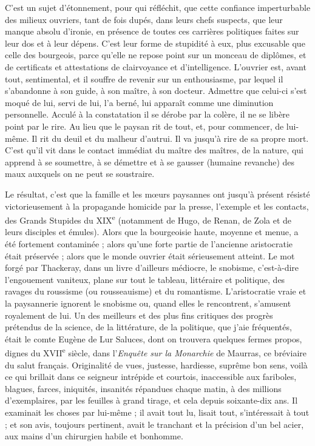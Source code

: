 \documentclass[french,twoside]{book} %
\begin{document}
C’est un sujet d’étonnement, pour qui réfléchit, que cette confiance imperturbable des milieux ouvriers, tant de fois dupés, dans leurs chefs suspects, que leur manque absolu d’ironie, en présence de toutes ces carrières politiques faites sur leur dos et à leur dépens. C’est leur forme de stupidité à eux, plus excusable que celle des bourgeois, parce qu’elle ne repose point sur un monceau de diplômes, et de certificats et attestations de clairvoyance et d’intelligence. L’ouvrier est, avant tout, sentimental, et il souffre de revenir sur un enthousiasme, par lequel il s’abandonne à son guide, à son maître, à son docteur. Admettre que celui-ci s’est moqué de lui, servi de lui, l’a berné, lui apparaît comme une diminution personnelle. Acculé à la constatation il se dérobe par la colère, il ne se libère point par le rire. Au lieu que le paysan rit de tout, et, pour commencer, de lui-même. Il rit du deuil et du malheur d’autrui. Il va jusqu’à rire de sa propre mort. C’est qu’il vit dans le contact immédiat du maître des maîtres, de la nature, qui apprend à se soumettre, à se démettre et à se gausser (humaine revanche) des maux auxquels on ne peut se soustraire.\par
Le résultat, c’est que la famille et les mœurs paysannes ont jusqu’à présent résisté victorieusement à la propagande homicide par la presse, l’exemple et les contacts, des Grands Stupides du XIX\textsuperscript{e} (notamment de Hugo, de Renan, de Zola et de leurs disciples et émules). Alors que la bourgeoisie haute, moyenne et menue, a été fortement contaminée ; alors qu’une forte partie de l’ancienne aristocratie était préservée ; alors que le monde ouvrier était sérieusement atteint. Le mot forgé par Thackeray, dans un livre d’ailleurs médiocre, le snobisme, c’est-à-dire l’engouement vaniteux, plane sur tout le tableau, littéraire et politique, des ravages du roussisme (ou rousseauisme) et du romantisme. L’aristocratie vraie et la paysannerie ignorent le snobisme ou, quand elles le rencontrent, s’amusent royalement de lui. Un des meilleurs et des plus fins critiques des progrès prétendus de la science, de la littérature, de la politique, que j’aie fréquentés, était le comte Eugène de Lur Saluces, dont on trouvera quelques fermes propos, dignes du XVII\textsuperscript{e} siècle, dans l’{\itshape Enquête sur la Monarchie} de Maurras, ce bréviaire du salut français. Originalité de vues, justesse, hardiesse, suprême bon sens, voilà ce qui brillait dans ce seigneur intrépide et courtois, inaccessible aux fariboles, blagues, farces, iniquités, insanités répandues chaque matin, à des millions d’exemplaires, par les feuilles à grand tirage, et cela depuis soixante-dix ans. Il examinait les choses par lui-même ; il avait tout lu, lisait tout, s’intéressait à tout ; et son avis, toujours pertinent, avait le tranchant et la précision d’un bel acier, aux mains d’un chirurgien habile et bonhomme.\par
\end{document}
